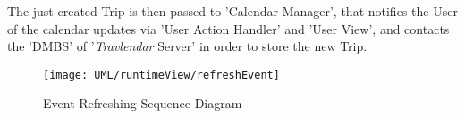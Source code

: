 	The just created Trip is then passed to 'Calendar Manager', that notifies the User of the calendar updates via 'User Action Handler' and 'User View', and contacts the 'DMBS' of '\textit{Travlendar} Server' in order to store the new Trip.
	
	
	\begin{figure}[H]
		\centering
		\texttt{[image: UML/runtimeView/refreshEvent]}
		\caption{Event Refreshing Sequence Diagram}
		\label{refreshRunTimeView}
	\end{figure}
	
	
	
